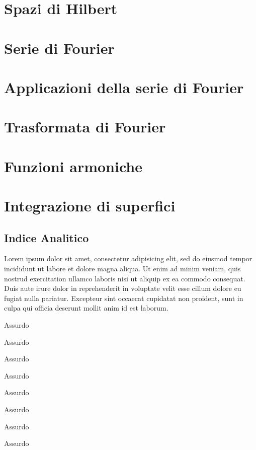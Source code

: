 \documentclass[a4paper, 11pt]{report}
\begin{document}
\chapter{Spazi di Hilbert}


\chapter{Serie di Fourier}


\chapter{Applicazioni della serie di Fourier}


\chapter{Trasformata di Fourier}


\chapter{Funzioni armoniche}


\chapter{Integrazione di superfici}


\newpage

\section{Indice Analitico}

Lorem ipsum dolor sit amet, consectetur adipisicing elit, sed do eiusmod
tempor incididunt ut labore et dolore magna aliqua. Ut enim ad minim veniam,
quis nostrud exercitation ullamco laboris nisi ut aliquip ex ea commodo
consequat. Duis aute irure dolor in reprehenderit in voluptate velit esse
cillum dolore eu fugiat nulla pariatur. Excepteur sint occaecat cupidatat non
proident, sunt in culpa qui officia deserunt mollit anim id est laborum.

\begin{multicols*}{2}

\makebox[3cm][l]{\absurd} Assurdo

\makebox[3cm][l]{\absurd} Assurdo

\makebox[3cm][l]{\absurd} Assurdo

\makebox[3cm][l]{\absurd} Assurdo

\vfill\null\columnbreak

\makebox[3cm][l]{\absurd} Assurdo

\makebox[3cm][l]{\absurd} Assurdo

\makebox[3cm][l]{\absurd} Assurdo

\makebox[3cm][l]{\absurd} Assurdo

\end{multicols*}
\end{document}
